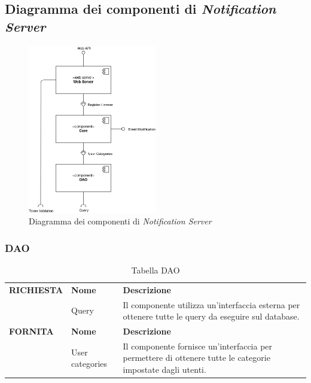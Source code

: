 \documentclass{article}
\begin{document}
\clearpage

\subsection{Diagramma dei componenti di \textit{Notification Server}}

\begin{figure}[htbp]
    \centering
    \includegraphics[width=0.5\textwidth]{Images/ComponentDiagram_Notification.drawio.png}
    \caption{Diagramma dei componenti di \textit{Notification Server}}
    \label{fig:component-diagram-notification}
\end{figure}

\subsubsection{DAO}

\begin{table}[htbp]
    \centering
    \renewcommand{\arraystretch}{1.3} %
    \begin{tabularx}{\textwidth}{| l | l | X |}
        \Xhline{2pt}
        \textbf{RICHIESTA} & \textbf{Nome} & \textbf{Descrizione} \\
        \Xhline{2pt}
         & Query & Il componente utilizza un'interfaccia esterna per ottenere tutte le query da eseguire sul database. \\
        \Xhline{2pt}
        \textbf{FORNITA} & \textbf{Nome} & \textbf{Descrizione} \\
        \Xhline{2pt}
         & User categories & Il componente fornisce un'interfaccia per permettere di ottenere tutte le categorie impostate dagli utenti. \\
        \hline
    \end{tabularx}
    \caption{Tabella DAO}
\end{table}
\end{document}
